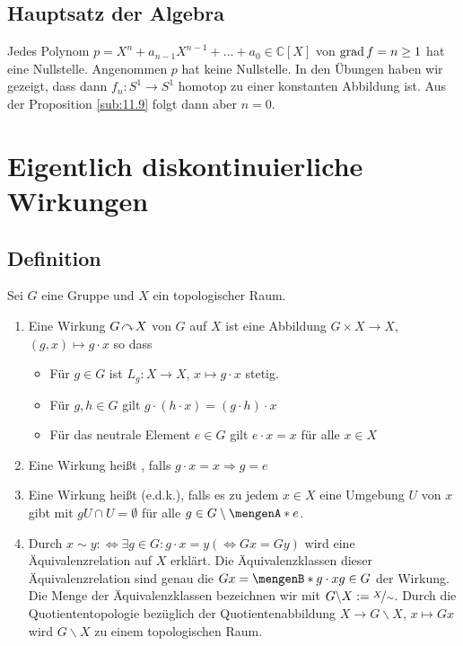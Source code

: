 \subsection{Hauptsatz der Algebra} %
\label{sub:1121}
Jedes Polynom $p = X^n + a_{n-1} X^{n-1} + \ldots  + a_0 \in \mathds{C}[X]$ von $\operatorname{grad} f = n \ge 1$ hat eine Nullstelle.
Angenommen $p$ hat keine Nullstelle. In den Übungen haben wir gezeigt, dass dann $f_n : S^1 \to S^1$ homotop zu einer konstanten Abbildung ist. Aus der Proposition 
\ref{sub:11.9} folgt dann aber $n=0$. \bewende
\newpage

\section{Eigentlich diskontinuierliche Wirkungen} %
\label{sec:12}

\subsection{Definition} %
\label{sub:12.1}
Sei $G$ eine Gruppe und $X$ ein topologischer Raum.
\begin{enumerate}[(1)]
	\item Eine Wirkung $G \!\curvearrowright\! X$ von $G$ auf $X$ ist eine Abbildung $G \times X \to X$, $(g,x) \mapsto g \cdot x$ so dass 
	\begin{itemize}
		\item Für $g \in G$ ist $L_g : X \to X$, $x \mapsto g \cdot x$ stetig.
		\item Für $g,h \in G$ gilt $g \cdot (h \cdot x)= (g \cdot h) \cdot x$
		\item Für das neutrale Element $e \in G$ gilt $e \cdot x = x$ für alle $x \in X$
	\end{itemize}
	\item Eine Wirkung heißt , falls $g \cdot x = x \Rightarrow g = e$
	\item Eine Wirkung heißt  (e.d.k.), falls es zu jedem $x \in X$ eine Umgebung $U$ von $x$
	gibt mit $g U\cap U = \emptyset$ für alle $g \in G \setminus \set{e}$.
	\item Durch $x \sim y :\Leftrightarrow \exists g \in G : g \cdot x = y (\Leftrightarrow G x = G y)$ wird eine 
	Äquivalenzrelation auf $X$ erklärt. Die Äquivalenzklassen dieser Äquivalenzrelation sind genau die  $Gx =\set[g\cdot x]{g \in G}$ der Wirkung.
	Die Menge der Äquivalenzklassen bezeichnen wir mit $G \backslash X := \nicefrac{X}{\sim}$. Durch die Quotiententopologie bezüglich der Quotientenabbildung $X \to G\backslash X$, $x \mapsto G x$ wird $G \backslash X$ zu einem topologischen Raum.
\end{enumerate}

